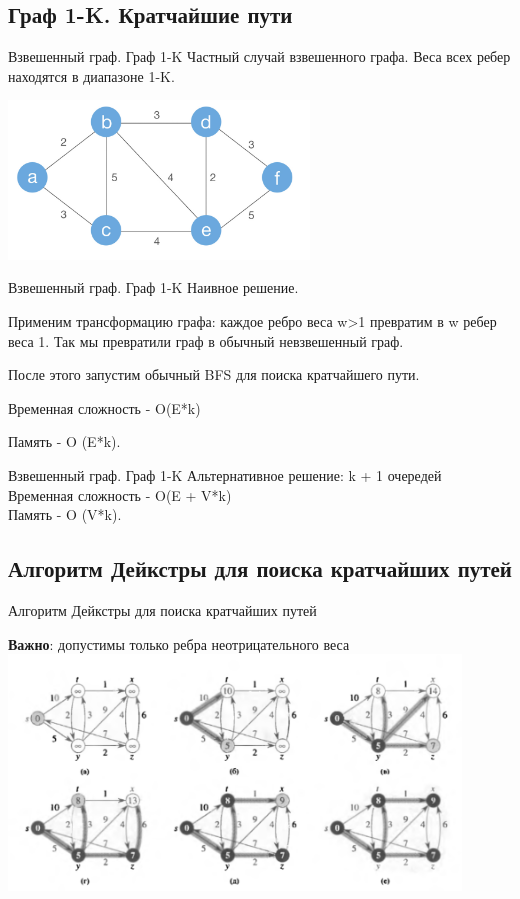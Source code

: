\documentclass[10pt]{beamer}
\begin{document}
\subsection{Граф 1-K. Кратчайшие пути}

\begin{frame}[fragile]{Взвешенный граф. Граф 1-K}
Частный случай взвешенного графа. 
Веса всех ребер находятся в диапазоне 1-K.

\includegraphics[width=8cm]{Term_2/Source/images/weigted_graph.jpg}
\end{frame}

\begin{frame}[fragile]{Взвешенный граф. Граф 1-K}
Наивное решение. 

Применим трансформацию графа: каждое ребро веса w>1 превратим в w ребер веса 1. Так мы превратили граф в обычный невзвешенный граф.

После этого запустим обычный BFS для поиска кратчайшего пути.

Временная сложность - O(E*k)

Память - O (E*k).

\end{frame}

\begin{frame}[fragile]{Взвешенный граф. Граф 1-K}
Альтернативное решение: k + 1 очередей\\
Временная сложность - O(E + V*k)\\
Память - O (V*k).

\end{frame}


\subsection{Алгоритм Дейкстры для поиска кратчайших путей}

\begin{frame}[fragile]{Алгоритм Дейкстры для поиска кратчайших путей}

\textbf{Важно}: допустимы только ребра неотрицательного веса 
    \includegraphics[width=12cm]{Term_2/Source/images/dijkstra.png}
\end{frame}
\end{document}
